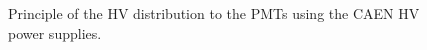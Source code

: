 \documentclass[12pt,a4paper]{article}
\newcommand{\pdftextimgpath}{./pdftex_t}
\begin{document}
\begin{figure}[h!]
  \begin{center}
    \scalebox{0.75}{}
  \end{center}
  \caption{Principle of  the HV distribution  to the PMTs  using the
    CAEN HV power supplies.}
  \label{fig:calohv:principle:1}
\end{figure}

\clearpage



\end{document}
